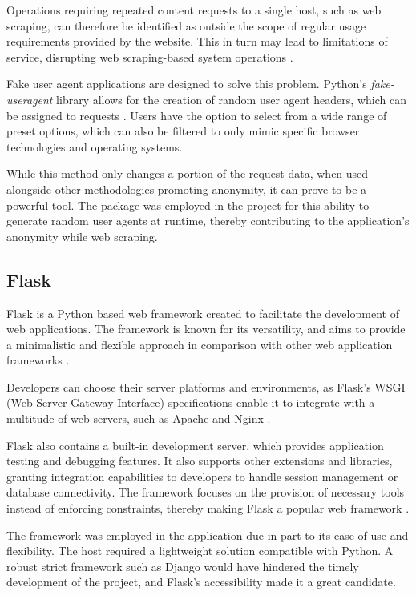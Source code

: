 \documentclass{thesis-ekf}
\theoremstyle{definition}
\theoremstyle{remark}
\begin{document}
{Operations requiring repeated content requests to a single host, such as web scraping, can therefore be identified as outside the scope of regular usage requirements provided by the website. This in turn may lead to limitations of service, disrupting web scraping-based system operations \cite{fake-useragent}.

Fake user agent applications are designed to solve this problem. Python's \emph{fake-useragent} library allows for the creation of random user agent headers, which can be assigned to requests \cite{fake-useragent}. Users have the option to select from a wide range of preset options, which can also be filtered to only mimic specific browser technologies and operating systems. 

While this method only changes a portion of the request data, when used alongside other methodologies promoting anonymity, it can prove to be a powerful tool. The package was employed in the project for this ability to generate random user agents at runtime, thereby contributing to the application's anonymity while web scraping.

\subsection{Flask}
Flask is a Python based web framework created to facilitate the development of web applications. The framework is known for its versatility, and aims to provide a minimalistic and flexible approach in comparison with other web application frameworks \cite{docs-flask}. 

Developers can choose their server platforms and environments, as Flask's WSGI (Web Server Gateway Interface) specifications enable it to integrate with a multitude of web servers, such as Apache and Nginx \cite{flask}.

Flask also contains a built-in development server, which provides application testing and debugging features. It also supports other extensions and libraries, granting integration capabilities to developers to handle session management or database connectivity. The framework focuses on the provision of necessary tools instead of enforcing constraints, thereby making Flask a popular web framework \cite{flask}.

The framework was employed in the application due in part to its ease-of-use and flexibility. The host required a lightweight solution compatible with Python. A robust strict framework such as Django would have hindered the timely development of the project, and Flask's accessibility made it a great candidate.   

}
\end{document}
